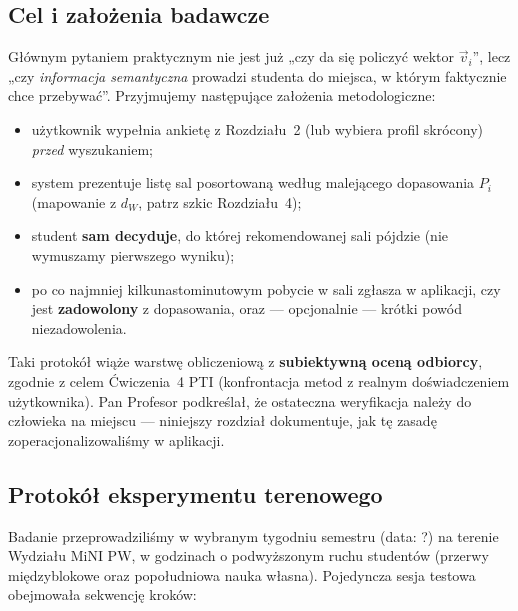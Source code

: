 \documentclass[14pt,a4paper]{extarticle}
\begin{document}
\subsection{Cel i założenia badawcze}
Głównym pytaniem praktycznym nie jest już „czy da się policzyć wektor $\vec{v}_i$”, lecz „czy \emph{informacja semantyczna} prowadzi studenta do miejsca, w którym faktycznie chce przebywać”. Przyjmujemy następujące założenia metodologiczne:
\begin{itemize}
    \item użytkownik wypełnia ankietę z Rozdziału~2 (lub wybiera profil skrócony) \emph{przed} wyszukaniem;
    \item system prezentuje listę sal posortowaną według malejącego dopasowania $P_i$ (mapowanie z $d_W$, patrz szkic Rozdziału~4);
    \item student \textbf{sam decyduje}, do której rekomendowanej sali pójdzie (nie wymuszamy pierwszego wyniku);
    \item po co najmniej kilkunastominutowym pobycie w sali zgłasza w aplikacji, czy jest \textbf{zadowolony} z dopasowania, oraz --- opcjonalnie --- krótki powód niezadowolenia.
\end{itemize}
Taki protokół wiąże warstwę obliczeniową z \textbf{subiektywną oceną odbiorcy}, zgodnie z celem Ćwiczenia~4 PTI (konfrontacja metod z realnym doświadczeniem użytkownika). Pan Profesor podkreślał, że ostateczna weryfikacja należy do człowieka na miejscu --- niniejszy rozdział dokumentuje, jak tę zasadę zoperacjonalizowaliśmy w aplikacji.

\subsection{Protokół eksperymentu terenowego}
Badanie przeprowadziliśmy w wybranym tygodniu semestru (data: ?) na terenie Wydziału MiNI PW, w godzinach o podwyższonym ruchu studentów (przerwy międzyblokowe oraz popołudniowa nauka własna). Pojedyncza sesja testowa obejmowała sekwencję kroków:
\end{document}
